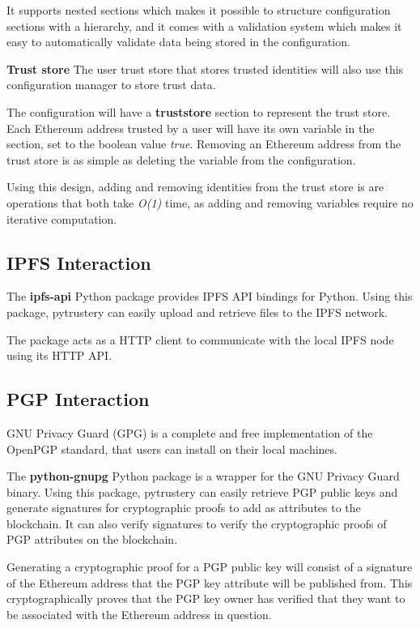 \documentclass[12pt,a4paper]{report}
\begin{document}
	It supports nested sections which makes it possible to structure configuration sections with a hierarchy, and it comes with a validation system which makes it easy to automatically validate data being stored in the configuration.\cite{19}
	
	\bigskip
	\noindent \textbf{Trust store}\newline
	The user trust store that stores trusted identities will also use this configuration manager to store trust data.
	
	The configuration will have a \textbf{truststore} section to represent the trust store. Each Ethereum address trusted by a user will have its own variable in the section, set to the boolean value \textit{true}. Removing an Ethereum address from the trust store is as simple as deleting the variable from the configuration.
	
	Using this design, adding and removing identities from the trust store is are operations that both take \textit{O(1)} time, as adding and removing variables require no iterative computation.
	
	\subsection{IPFS Interaction}
	The \textbf{ipfs-api} Python package provides IPFS API bindings for Python\cite{20}. Using this package, pytrustery can easily upload and retrieve files to the IPFS network.
	
	The package acts as a HTTP client to communicate with the local IPFS node using its HTTP API.
	
	\subsection{PGP Interaction}
	GNU Privacy Guard (GPG) is a complete and free implementation of the OpenPGP standard, that users can install on their local machines.\cite{22}	
	
	The \textbf{python-gnupg} Python package is a wrapper for the GNU Privacy Guard binary.\cite{21} Using this package, pytrustery can easily retrieve PGP public keys and generate signatures for cryptographic proofs to add as attributes to the blockchain. It can also verify signatures to verify the cryptographic proofs of PGP attributes on the blockchain.
	
	Generating a cryptographic proof for a PGP public key will consist of a signature of the Ethereum address that the PGP key attribute will be published from. This cryptographically proves that the PGP key owner has verified that they want to be associated with the Ethereum address in question.
	
\end{document}
